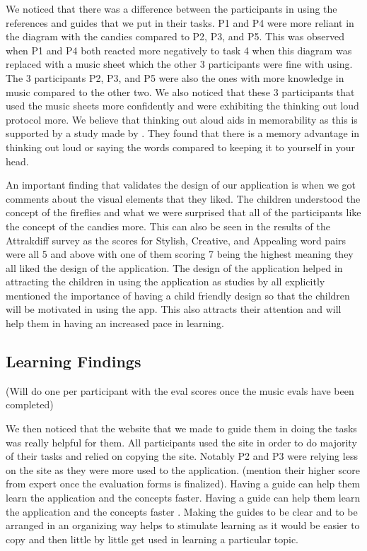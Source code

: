 We noticed that there was a difference between the participants in using the references and guides that we put in their tasks.
P1 and P4 were more reliant in the diagram with the candies compared to P2, P3, and P5. This was observed when P1 and P4 both reacted more negatively to task 4 when this diagram was replaced with a music sheet which the other 3 participants were fine with using. The 3 participants P2, P3, and P5 were also the ones with more knowledge in music compared to the other two. We also noticed that these 3 participants that used the music sheets more confidently and were exhibiting the thinking out loud protocol more. We believe that thinking out aloud aids in memorability as this is supported by a study made by \cite{gagne1962study}. They found that there is a memory advantage in thinking out loud or saying the words compared to keeping it to yourself in your head. 

An important finding that validates the design of our application is when we got comments about the visual elements that they liked. The children understood the concept of the fireflies and what we were surprised that all of the participants like the concept of the candies more. This can also be seen in the results of the Attrakdiff survey as the scores for Stylish, Creative, and Appealing word pairs were all 5 and above with one of them scoring 7 being the highest meaning they all liked the design of the application. The design of the application helped in attracting the children in using the application as studies by \cite{cohen2011young,burton2016music,chung2017designing} all explicitly mentioned the importance of having a child friendly design so that the children will be motivated in using the app. This also attracts their attention and will help them in having an increased pace in learning. 

\subsection{Learning Findings}

(Will do one per participant with the eval scores once the music evals have been completed)

We then noticed that the website that we made to guide them in doing the tasks was really helpful for them. All participants used the site in order to do majority of their tasks and relied on copying the site. Notably P2 and P3 were relying less on the site as they were more used to the application. (mention their higher score from expert once the evaluation forms is finalized). Having a guide can help them learn the application and the concepts faster. Having a guide can help them learn the application and the concepts faster \cite{pashler2007organizing}. Making the guides to be clear and to be arranged in an organizing way helps to stimulate learning as it would be easier to copy and then little by little get used in learning a particular topic. 

